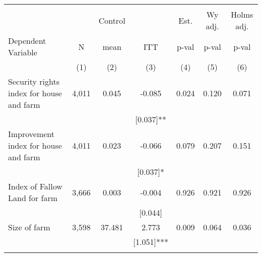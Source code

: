 \begin{tabular}{lcccccc}
\hline \noalign{\smallskip} &  &  &  &  &  & \\
 &  & Control &  & Est. & Wy adj. & Holms adj.\\
Dependent Variable & N & mean & ITT & p-val & p-val & p-val\\
 & (1) & (2) & (3) & (4) & (5) & (6)\\
\noalign{\smallskip}\hline \noalign{\smallskip}Security rights index for house and farm & 4,011 & 0.045 & -0.085 & 0.024 & 0.120 & 0.071\\
 &  &  & [0.037]** &  &  & \\
Improvement index for house and farm & 4,011 & 0.023 & -0.066 & 0.079 & 0.207 & 0.151\\
 &  &  & [0.037]* &  &  & \\
Index of Fallow Land for farm & 3,666 & 0.003 & -0.004 & 0.926 & 0.921 & 0.926\\
 &  &  & [0.044] &  &  & \\
Size of farm & 3,598 & 37.481 & 2.773 & 0.009 & 0.064 & 0.036\\
 &  &  & [1.051]*** &  &  & \\
\noalign{\smallskip}\hline\end{tabular}
